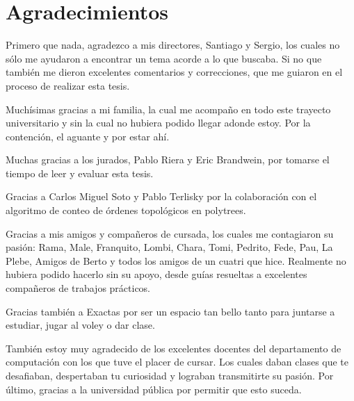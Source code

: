 \section*{Agradecimientos}

Primero que nada, agradezco a mis directores, Santiago y Sergio, los cuales no sólo me ayudaron a encontrar un tema acorde a lo que buscaba. Si no que también me dieron excelentes comentarios y correcciones, que me guiaron en el proceso de realizar esta tesis. 

Muchísimas gracias a mi familia, la cual me acompaño en todo este trayecto universitario y sin la cual no hubiera podido llegar adonde estoy. Por la contención, el aguante y por estar ahí.

Muchas gracias a los jurados, Pablo Riera y Eric Brandwein, por tomarse el tiempo de leer y evaluar esta tesis. 

Gracias a Carlos Miguel Soto y Pablo Terlisky por la colaboración con el algoritmo de conteo de órdenes topológicos en polytrees. 

Gracias a mis amigos y compañeros de cursada, los cuales me contagiaron su pasión: Rama, Male, Franquito, Lombi, Chara, Tomi, Pedrito, Fede, Pau, La Plebe, Amigos de Berto y todos los amigos de un cuatri que hice. Realmente no hubiera podido hacerlo sin su apoyo, desde guías resueltas a excelentes compañeros de trabajos prácticos. 

Gracias también a Exactas por ser un espacio tan bello tanto para juntarse a estudiar, jugar al voley o dar clase. 

También estoy muy agradecido de los excelentes docentes del departamento de computación con los que tuve el placer de cursar. Los cuales daban clases que te desafiaban, despertaban tu curiosidad y  lograban transmitirte su pasión. Por último, gracias a la universidad pública por permitir que esto suceda. 
    


 